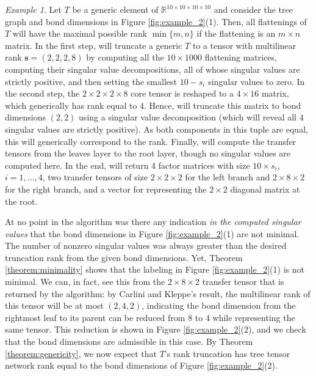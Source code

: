 \documentclass{amsart}
\theoremstyle{plain}
\theoremstyle{definition}
\theoremstyle{remark}
\newtheorem{example}[theorem]{Example}
\begin{document}
\begin{example}
Let $T$ be a generic element of $\mathbb{R}^{10 \times 10 \times 10 \times 10}$ and consider the tree graph and bond dimensions in Figure \ref{fig:example_2}(1). Then, all flattenings of $T$ will have the maximal possible rank $\min\{m,n\}$ if the flattening is an $m \times n$ matrix. In the first step, \cite[Algorithm 2]{grasedyck} will truncate a generic $T$ to a tensor with multilinear rank $\mathbf{s}=(2,2,2,8)$ by computing all the $10 \times 1000$ flattening matrices, computing their singular value decompositions, all of whose singular values are strictly positive, and then setting the smallest $10-s_i$ singular values to zero. In the second step, the $2 \times 2 \times 2 \times 8$ core tensor is reshaped to a $4 \times 16$ matrix, which generically has rank equal to $4$. Hence, \cite[Algorithm 2]{grasedyck} will truncate this matrix to bond dimensions $(2,2)$ using a singular value decomposition (which will reveal all $4$ singular values are strictly positive). As both components in this tuple are equal, this will generically correspond to the rank. Finally, \cite[Algorithm 2]{grasedyck} will compute the transfer tensors from the leaves layer to the root layer, though no singular values are computed here. In the end, \cite[Algorithm 2]{grasedyck} will return 4 factor matrices with size $10 \times s_i$, $i=1,\dots,4$, two transfer tensors of size $2 \times 2 \times 2$ for the left branch and $2 \times 8 \times 2$ for the right branch, and a vector for representing the $2\times2$ diagonal matrix at the root. 

At no point in the algorithm was there any indication \emph{in the computed singular values} that the bond dimensions in Figure \ref{fig:example_2}(1) are not minimal. The number of nonzero singular values was always greater than the desired truncation rank from the given bond dimensions. Yet, Theorem \ref{theorem:minimality} shows that the labeling in Figure \ref{fig:example_2}(1) is not minimal. We can, in fact, see this from the $2 \times 8 \times 2$ transfer tensor that is returned by the algorithm: by Carlini and Kleppe's result, the multilinear rank of this tensor will be at most $(2,4,2)$, indicating the bond dimension from the rightmost leaf to its parent can be reduced from 8 to 4 while representing the same tensor. This reduction is shown in Figure \ref{fig:example_2}(2), and we check that the bond dimensions are admissible in this case. By Theorem \ref{theorem:genericity}, we now expect that $T$'s rank truncation has tree tensor network rank equal to the bond dimensions of Figure \ref{fig:example_2}(2). 

\end{example}
\end{document}
